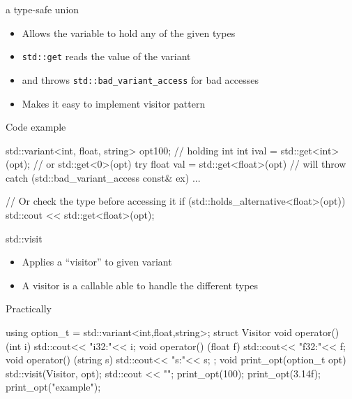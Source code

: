 \begin{frame}[fragile]
  \begin{block}{a type-safe union}
    \begin{itemize}
    \item Allows the variable to hold any of the given types
    \item \texttt{std::get} reads the value of the variant
    \item and throws \texttt{std::bad\_variant\_access} for bad accesses
    \item Makes it easy to implement visitor pattern
    \end{itemize}
  \end{block}
  \begin{exampleblock}{Code example}
    \small
    \begin{cppcode*}{}
      std::variant<int, float, string> opt{100}; // holding int
      int ival = std::get<int>(opt); // or std::get<0>(opt)
      try {
        float val = std::get<float>(opt) // will throw
      } catch (std::bad_variant_access const& ex) {...}

      // Or check the type before accessing it
      if (std::holds_alternative<float>(opt))
          std::cout << std::get<float>(opt);
    \end{cppcode*}
  \end{exampleblock}

\end{frame}

\begin{frame}[fragile]
  \begin{block}{std::visit}
    \begin{itemize}
    \item Applies a ``visitor'' to given variant
    \item A visitor is a callable able to handle the different types
    \end{itemize}
  \end{block}
  \begin{exampleblock}{Practically}
    \small
    \begin{cppcode*}{}
      using option_t = std::variant<int,float,string>;
      struct Visitor {
        void operator() (int i) { std::cout<< "i32:"<< i;}
        void operator() (float f) { std::cout<< "f32:"<< f;}
        void operator() (string s) { std::cout<< "s:"<< s;}
      };
      void print_opt(option_t opt) {
        std::visit(Visitor{}, opt);
        std::cout << "\n";
      }
      print_opt(100); print_opt(3.14f); print_opt("example");
    \end{cppcode*}
  \end{exampleblock}
\end{frame}

